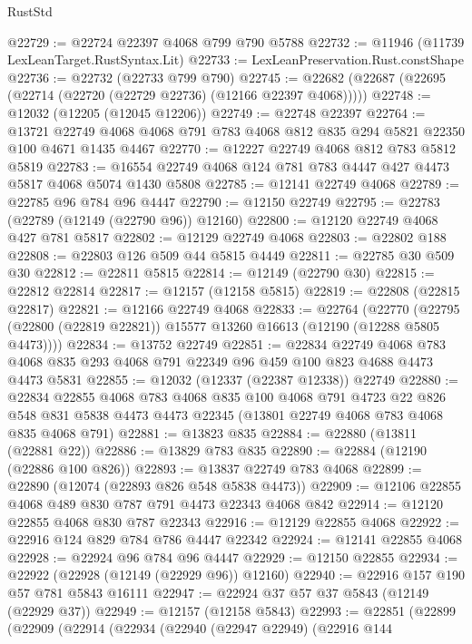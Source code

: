 \begin{lexlean}{RustStd}
\begin{coremodule}
@22729 := @22724 @22397 @4068 @799 @790 @5788
@22732 := @11946 (@11739 LexLeanTarget.RustSyntax.Lit)
@22733 := LexLeanPreservation.Rust.constShape
@22736 := @22732 (@22733 @799 @790)
@22745 := @22682 (@22687 (@22695 (@22714 (@22720 (@22729 @22736) (@12166 @22397 @4068)))))
@22748 := @12032 (@12205 (@12045 @12206))
@22749 := @22748 @22397
@22764 := @13721
    @22749
    @4068
    @4068
    @791
    @783
    @4068
    @812
    @835
    @294
    @5821
    @22350
    @100
    @4671
    @1435
    @4467
@22770 := @12227 @22749 @4068 @812 @783 @5812 @5819
@22783 := @16554 @22749 @4068 @124 @781 @783 @4447 @427 @4473 @5817 @4068 @5074 @1430 @5808
@22785 := @12141 @22749 @4068
@22789 := @22785 @96 @784 @96 @4447
@22790 := @12150 @22749
@22795 := @22783 (@22789 (@12149 (@22790 @96)) @12160)
@22800 := @12120 @22749 @4068 @427 @781 @5817
@22802 := @12129 @22749 @4068
@22803 := @22802 @188
@22808 := @22803 @126 @509 @44 @5815 @4449
@22811 := @22785 @30 @509 @30
@22812 := @22811 @5815
@22814 := @12149 (@22790 @30)
@22815 := @22812 @22814
@22817 := @12157 (@12158 @5815)
@22819 := @22808 (@22815 @22817)
@22821 := @12166 @22749 @4068
@22833 := @22764
    (@22770 (@22795 (@22800 (@22819 @22821)) @15577 @13260 @16613 (@12190 (@12288 @5805 @4473))))
@22834 := @13752 @22749
@22851 := @22834
    @22749
    @4068
    @783
    @4068
    @835
    @293
    @4068
    @791
    @22349
    @96
    @459
    @100
    @823
    @4688
    @4473
    @4473
    @5831
@22855 := @12032 (@12337 (@22387 @12338)) @22749
@22880 := @22834
    @22855
    @4068
    @783
    @4068
    @835
    @100
    @4068
    @791
    @4723
    @22
    @826
    @548
    @831
    @5838
    @4473
    @4473
    @22345
    (@13801 @22749 @4068 @783 @4068 @835 @4068 @791)
@22881 := @13823 @835
@22884 := @22880 (@13811 (@22881 @22))
@22886 := @13829 @783 @835
@22890 := @22884 (@12190 (@22886 @100 @826))
@22893 := @13837 @22749 @783 @4068
@22899 := @22890 (@12074 (@22893 @826 @548 @5838 @4473))
@22909 := @12106 @22855 @4068 @489 @830 @787 @791 @4473 @22343 @4068 @842
@22914 := @12120 @22855 @4068 @830 @787 @22343
@22916 := @12129 @22855 @4068
@22922 := @22916 @124 @829 @784 @786 @4447 @22342
@22924 := @12141 @22855 @4068
@22928 := @22924 @96 @784 @96 @4447
@22929 := @12150 @22855
@22934 := @22922 (@22928 (@12149 (@22929 @96)) @12160)
@22940 := @22916 @157 @190 @57 @781 @5843 @16111
@22947 := @22924 @37 @57 @37 @5843 (@12149 (@22929 @37))
@22949 := @12157 (@12158 @5843)
@22993 := @22851
    (@22899
      (@22909
        (@22914
          (@22934
            (@22940
              (@22947 @22949)
              (@22916
                @144

\end{coremodule}
\end{lexlean}
